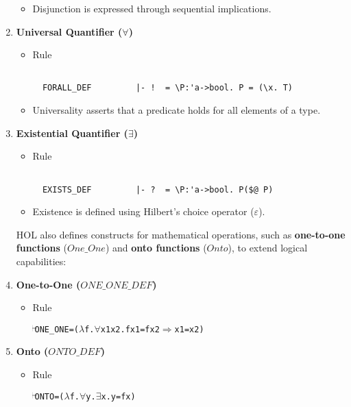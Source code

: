 \begin{enumerate}
\begin{itemize}
\begin{verbatim}
\end{verbatim}
        \item Disjunction is expressed through sequential implications.
    \end{itemize}

    \item \textbf{Universal Quantifier (\(\forall\))}
    \begin{itemize}
        \item Rule
\begin{verbatim}

  FORALL_DEF         |- !  = \P:'a->bool. P = (\x. T)

\end{verbatim}
        \item Universality asserts that a predicate holds for all elements of a type.
    \end{itemize}

    \item \textbf{Existential Quantifier (\(\exists\))}
    \begin{itemize}
        \item Rule
\begin{verbatim}

  EXISTS_DEF         |- ?  = \P:'a->bool. P($@ P)

\end{verbatim}
        \item Existence is defined using Hilbert’s choice operator (\(\varepsilon\)).
    \end{itemize}

HOL also defines constructs for mathematical operations, such as \textbf{one-to-one functions} (\(One\_One\)) and \textbf{onto functions} (\(Onto\)), to extend logical capabilities:

    \item \textbf{One-to-One (\(ONE\_ONE\_DEF\))}
    \begin{itemize}
        \item Rule
          \begin{alltt}
            \(\!\!\!{\turn}\!\!\!\!\) ONE_ONE = (\(\lambda\)f. \(\forall\)x1 x2. f x1 = f x2 \(\Rightarrow\) x1 = x2)
          \end{alltt}
    \end{itemize}

    \item \textbf{Onto (\(ONTO\_DEF\))}
    \begin{itemize}
        \item Rule
          \begin{alltt}
            \(\!\!\!{\turn}\!\!\!\!\) ONTO = (\(\lambda\)f. \(\forall\)y. \(\exists\)x. y = f x)
          \end{alltt}
    \end{itemize}


\end{enumerate}
